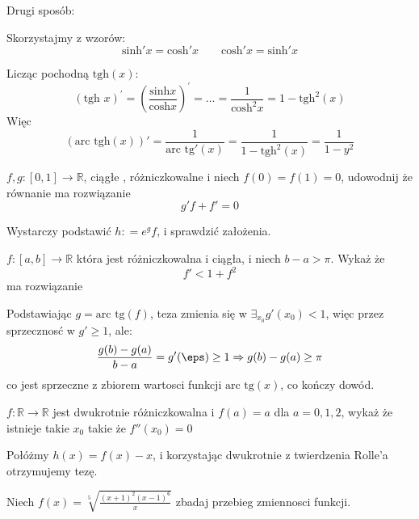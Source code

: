 \documentclass[11pt]{scrartcl}
\begin{document}
      Drugi sposób:

      Skorzystajmy z wzorów:
      \[
          \text{sinh}' x = \text{cosh}' x \qquad \text{cosh}' x = \text{sinh}' x   
      \]
     
      Licząc pochodną $\text{tgh} \left ( x \right ) $:
      \[
          \left ( \text{tgh } x \right )^{'} = \left ( \frac{\text{sinh} x }{\text{cosh} x } \right )^{'} = \dots = \frac{1}{\text{cosh}^2 x } = 1 - \text{tgh}^2  \left ( x \right ) 
      \]
      Więc 
      \[
        (\text{arc tgh} \left ( x \right ))' = \frac{1}{ \text{arc tg}' \left ( x \right ) } = \frac{1}{1 - \text{tgh}^2 \left ( x \right ) } = \frac{1}{1- y^2} 
      \]
      
      \begin{zadanie}
           $f,g : \left [ 0,1 \right ] \to \mathbb{R}$, ciągłe , różniczkowalne i niech $f(0) = f(1) = 0$, udowodnij że równanie ma rozwiązanie
           \[
               g' f + f' = 0
           \]
      \end{zadanie}
      Wystarczy podstawić $h : = e^g f$, i sprawdzić założenia.

      \begin{zadanie}
        $f : \left [ a,b \right ]  \to \mathbb{R} $ która jest różniczkowalna i ciągła, i niech $b - a > \pi $.
        Wykaż że
        \[
            f' < 1 + f^2
        \]
        ma rozwiązanie
      \end{zadanie}
      
      Podstawiając $g = \text{arc tg} \left ( f \right ) $, teza zmienia się w $\exists_{x_{0}} g'(x_{0}) < 1$,
      więc przez sprzecznosć w $g' \geq 1$, ale:
      \[
          \frac{g(b) - g(a)}{b -a} = g'(\eps) \geq 1 \Rightarrow g(b) - g(a) \geq \pi 
      \]
      co jest sprzeczne z zbiorem wartosci funkcji $\text{arc tg} \left ( x \right ) $, co kończy dowód.

      \begin{zadanie}
          $f: \mathbb{R}  \to \mathbb{R} $ jest dwukrotnie różniczkowalna i $f(a) = a$ dla $a = 0, 1, 2$, wykaż że istnieje takie $x_{0}$ takie że $f''(x_{0}) = 0$
      \end{zadanie}
      Połóżmy $h(x) = f(x) - x$, i korzystając dwukrotnie z twierdzenia Rolle'a otrzymujemy tezę.

      \begin{zadanie}
          Niech $f(x) = \sqrt[5]{\frac{(x+1)^2 (x-1)^6}{x}}$ zbadaj przebieg zmiennosci funkcji. 
      \end{zadanie}
\end{document}
